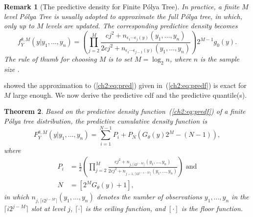 \documentclass[12pt]{article}
\newtheorem{thm}{Theorem}[section]
\newtheorem{rmk}[thm]{Remark}
\newcommand{\polya}{P\'{o}lya}
\begin{document}
\begin{rmk}[The predictive density for Finite \polya{} Tree]
  In practice, a finite $M$ level \polya{} Tree is usually adopted to
  approximate the full \polya{} tree, in which, only up to $M$ levels
  are updated. The corresponding predictive density becomes
  \begin{equation}
    \label{ch2:eq:predf}
    f_Y^{\theta, M} (y|y_1, \ldots, y_n)  =  \left(
      \prod_{j=2}^M \frac{cj^2 + n_{\epsilon_1 \cdots \epsilon_j(y) }(y_1, \ldots, y_n)}{2cj^2
        + n_{\epsilon_1 \cdots \epsilon_{j-1}(y)}(y_1, \ldots, y_n)}
    \right)2^{M-1} g_0(y).
  \end{equation}
  The rule of thumb for choosing $M$ is to set $M=\log_2n$, where $n$
  is the sample size \citep{hanson2002}.
\end{rmk}

\citet{hanson2002} showed the approximation to (\ref{ch2:eq:pred}) given
in~(\ref{ch2:eq:predf}) is exact for $M$ large enough.  We now derive the
predictive cdf and the predictive quantile(s).

\begin{thm}
  Based on the predictive density function~(\ref{ch2:eq:predf}) of a
  finite \polya{} tree distribution, the predictive cumulative density
  function is
  \begin{equation}
    \label{ch2:eq:cdf}
    F^{\theta,M}_Y(y|y_1, \ldots, y_n) = \sum_{i=1}^{N-1} P_{i} + P_N
    \left( G_{\theta}(y)2^M -(N-1) \right),
  \end{equation}
  where
  \begin{align*}
    P_i &= \frac{1}{2} \left(\prod_{j=2}^M \frac{cj^2 + n_{j,\lceil
          i2^{j-M} \rceil}(y_1, \ldots, y_n)}{2cj^2 + n_{j-1,\lceil
          i2^{j-1-M} \rceil}(y_{1 },\ldots, y_n)} \right) \mbox{ and}\\
    N & = \left[ 2^{M } G_{\theta}(y) +1\right],
  \end{align*}
  in which $n_{j,\lceil i2^{j-M} \rceil}(y_1, \ldots, y_n)$ denotes
  the number of observations $y_1, \ldots, y_n$ in the $\lceil
  i2^{j-M} \rceil$ slot at level $j$, $\lceil \cdot \rceil$ is the
  ceiling function, and $[ \cdot ]$ is the floor function.
\end{thm}
\end{document}
